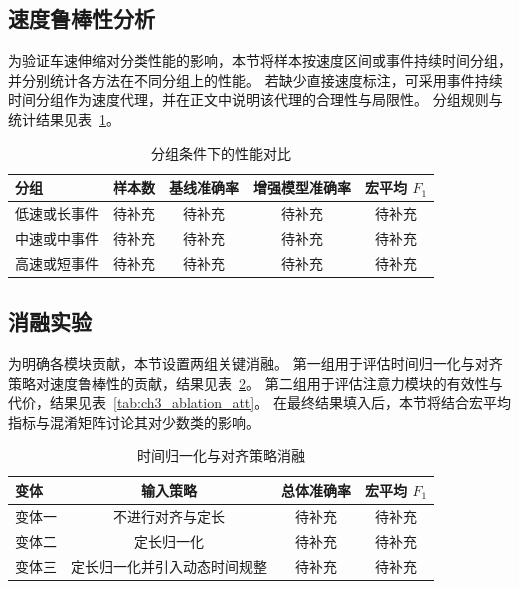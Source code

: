 \documentclass{xdupgthesis}
\begin{document}


\subsection{速度鲁棒性分析}
为验证车速伸缩对分类性能的影响，本节将样本按速度区间或事件持续时间分组，并分别统计各方法在不同分组上的性能。
若缺少直接速度标注，可采用事件持续时间分组作为速度代理，并在正文中说明该代理的合理性与局限性。
分组规则与统计结果见表~\ref{tab:ch3_speed_group}。

\begin{table}[htbp]
\centering
\caption{分组条件下的性能对比}
\label{tab:ch3_speed_group}
\begin{tabular}{lcccc}
\hline
分组 & 样本数 & 基线准确率 & 增强模型准确率 & 宏平均 $F_1$ \\
\hline
低速或长事件 & 待补充 & 待补充 & 待补充 & 待补充 \\
中速或中事件 & 待补充 & 待补充 & 待补充 & 待补充 \\
高速或短事件 & 待补充 & 待补充 & 待补充 & 待补充 \\
\hline
\end{tabular}
\end{table}

\subsection{消融实验}
为明确各模块贡献，本节设置两组关键消融。
第一组用于评估时间归一化与对齐策略对速度鲁棒性的贡献，结果见表~\ref{tab:ch3_ablation_align}。
第二组用于评估注意力模块的有效性与代价，结果见表~\ref{tab:ch3_ablation_att}。
在最终结果填入后，本节将结合宏平均指标与混淆矩阵讨论其对少数类的影响。

\begin{table}[htbp]
\centering
\caption{时间归一化与对齐策略消融}
\label{tab:ch3_ablation_align}
\begin{tabular}{lccc}
\hline
变体 & 输入策略 & 总体准确率 & 宏平均 $F_1$ \\
\hline
变体一 & 不进行对齐与定长 & 待补充 & 待补充 \\
变体二 & 定长归一化 & 待补充 & 待补充 \\
变体三 & 定长归一化并引入动态时间规整 & 待补充 & 待补充 \\
\hline
\end{tabular}
\end{table}
\end{document}
